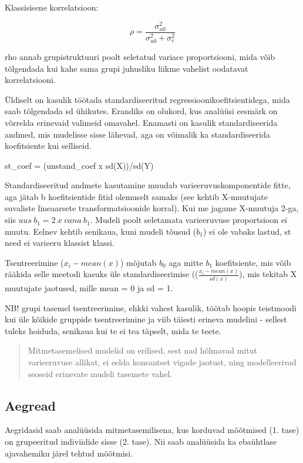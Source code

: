 \documentclass[]{book}
\begin{document}
Klassisisene korrelatsioon:

\[\rho = \frac{\sigma^2_{u0}}{\sigma^2_{u0} + \sigma^2_e}\]

rho annab grupistruktuuri poolt seletatud variace proportsiooni, mida
võib tõlgendada kui kahe sama grupi juhusliku liikme vahelist oodatavat
korrelatsiooni.

Üldiselt on kasulik töötada standardiseeritud
regressioonikoefitsientidega, mida saab tõlgendada sd ühikutes. Erandiks
on olukord, kus analüüsi eesmärk on võrrelda erinevaid valimeid
omavahel. Enamasti on kasulik standardiseerida andmed, mis mudelisse
sisse lähevad, aga on võimalik ka standardiseerida koefitsiente kui
selliseid.

st\_coef = (unstand\_coef x sd(X))/sd(Y)

Standardiseeritud andmete kasutamine muudab varieeruvuskomponentide
fitte, aga jätab b koefitsientide fitid olemuselt samaks (see kehtib
X-muutujate suvaliste lineaarsete transformatsioonide korral). Kui me
jagame X-muutuja 2-ga, siis \(uus ~b_1 = 2 ~x~vana~ b_1\). Mudeli poolt
seletamata varieeruvuse proportsioon ei muutu. Eelnev kehtib senikaua,
kuni mudeli tõusud (\(b_1\)) ei ole vabaks lastud, st need ei varieeru
klassist klassi.

Tsentreerimine (\(x_i - mean(x)\)) mõjutab \(b_0\) aga mitte \(b_1\)
koefitsiente, mis võib rääkida selle meetodi kasuks üle
standardiseerimise ((\(\frac {x_i - mean(x)}{sd(x)}\)), mis tekitab X
muutujate jaotused, mille mean = 0 ja sd = 1.

NB! grupi tasemel tsentreerimine, ehkki vahest kasulik, töötab hoopis
teistmoodi kui üle kõikide gruppide tsentreerimine ja viib täiesti
erineva mudelini - sellest tuleks hoiduda, senikaua kui te ei tea
täpselt, mida te teete.

\begin{quote}
Mitmetasemelised mudelid on erilised, sest nad hõlmavad mitut
varieeruvuse allikat, ei eelda konsantset vigade jaotust, ning
modelleerivad seoseid erinevate mudeli tasemete vahel.
\end{quote}

\subsection{Aegread}\label{aegread}

Aegridasid saab analüüsida mitmetasemilisena, kus korduvad mõõtmised (1.
tase) on grupeeritud indiviidide sisse (2. tase). Nii saab analüüsida ka
ebaühtlase ajavahemiku järel tehtud mõõtmisi.
\end{document}
